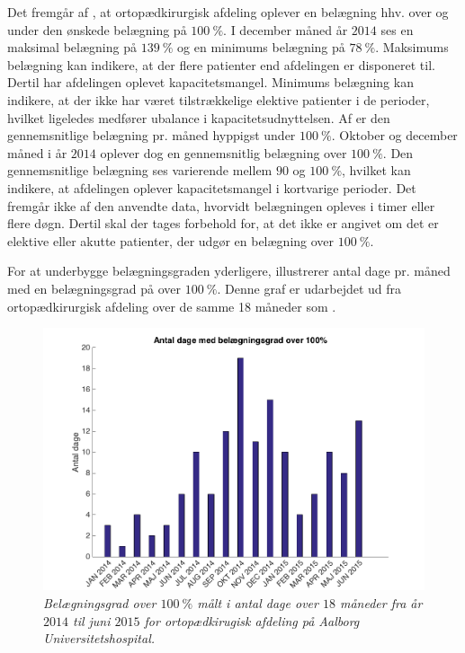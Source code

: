 \noindent
Det fremgår af , at ortopædkirurgisk afdeling oplever en belægning hhv. over og under den ønskede belægning på $100~\%$. I december måned år $2014$ ses en maksimal belægning på $139~\%$ og en minimums belægning på $78~\%$. Maksimums belægning kan indikere, at der flere patienter end afdelingen er disponeret til. Dertil har afdelingen oplevet kapacitetsmangel. Minimums belægning kan indikere, at der ikke har været tilstrækkelige elektive patienter i de perioder, hvilket ligeledes medfører ubalance i kapacitetsudnyttelsen. Af  er den gennemsnitlige belægning pr. måned hyppigst under $100~\%$. Oktober og december måned i år $2014$ oplever dog en gennemsnitlig belægning over $100~\%$. Den gennemsnitlige belægning ses varierende mellem $90$ og $100~\%$, hvilket kan indikere, at afdelingen oplever kapacitetsmangel i kortvarige perioder.\cite{SDS2015} 
Det fremgår ikke af den anvendte data, hvorvidt belægningen opleves i timer eller flere døgn. Dertil skal der tages forbehold for, at det ikke er angivet om det er elektive eller akutte patienter, der udgør en belægning over $100~\%$.\cite{SDS2015} 

 
For at underbygge belægningsgraden yderligere, illustrerer  antal dage pr. måned med en belægningsgrad på over $100~\%$. Denne graf er udarbejdet ud fra ortopædkirurgisk afdeling over de samme 18 måneder som . \cite{SDS2015} 

\begin{figure}[H]
	\flushleft 
	\centering
	\includegraphics[scale=.4]{figures/antaldage.png}
	\flushleft
	\caption{\textit{Belægningsgrad over $100~\%$ målt i antal dage over $18$ måneder fra år $2014$ til juni $2015$ for ortopædkirugisk afdeling på Aalborg Universitetshospital.}\cite{SDS2015}}
	\label{antaldage}
\end{figure}


